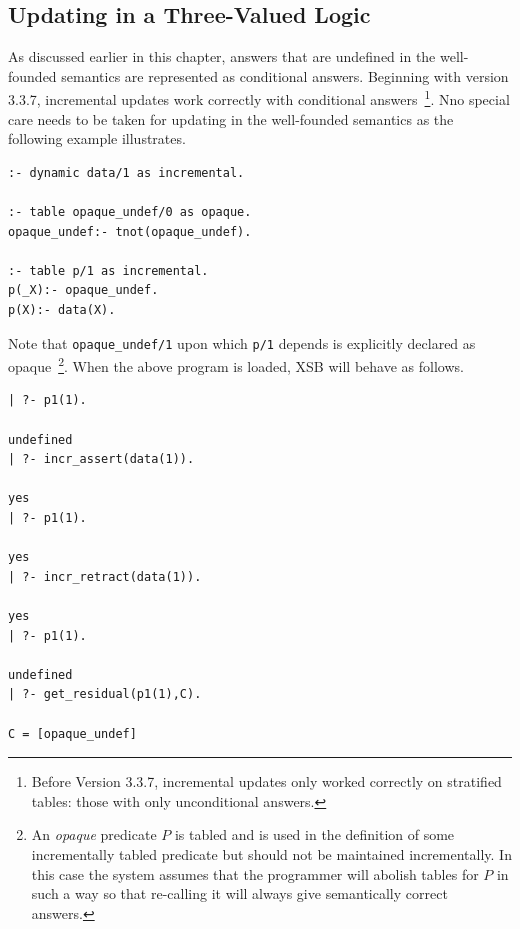 \subsection{Updating in a Three-Valued Logic}
%
As discussed earlier in this chapter, answers that are undefined in
the well-founded semantics are represented as conditional answers.
Beginning with version 3.3.7, incremental updates work correctly with
conditional answers~\footnote{Before Version 3.3.7, incremental
  updates only worked correctly on stratified tables: those with only
  unconditional answers.}.  Nno special care needs to be taken for
updating in the well-founded semantics as the following example
illustrates.

\begin{verbatim}
:- dynamic data/1 as incremental.

:- table opaque_undef/0 as opaque.
opaque_undef:- tnot(opaque_undef).

:- table p/1 as incremental.
p(_X):- opaque_undef.
p(X):- data(X).
\end{verbatim}
%
Note that {\tt opaque\_undef/1} upon which {\tt p/1} depends is
explicitly declared as opaque~\footnote{An {\em opaque} predicate $P$
  is tabled and is used in the definition of some incrementally tabled
  predicate but should not be maintained incrementally.  In this case
  the system assumes that the programmer will abolish tables for $P$
  in such a way so that re-calling it will always give semantically
  correct answers.}.  When the above program is loaded, XSB will
behave as follows.
%
{\small
\begin{verbatim}
| ?- p1(1).

undefined
| ?- incr_assert(data(1)).

yes
| ?- p1(1).

yes
| ?- incr_retract(data(1)).

yes
| ?- p1(1).

undefined
| ?- get_residual(p1(1),C).

C = [opaque_undef]
\end{verbatim}
}
%

